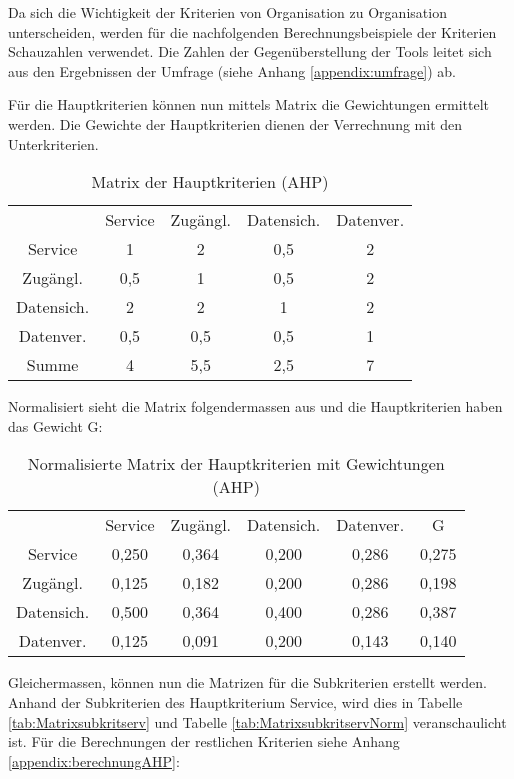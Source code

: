 Da sich die Wichtigkeit der Kriterien von Organisation zu Organisation unterscheiden, werden für die nachfolgenden Berechnungsbeispiele der Kriterien Schauzahlen verwendet. Die Zahlen der Gegenüberstellung der Tools leitet sich aus den Ergebnissen der Umfrage (siehe Anhang \ref{appendix:umfrage}) ab. 

Für die Hauptkriterien können nun mittels Matrix die Gewichtungen ermittelt werden. Die Gewichte der Hauptkriterien dienen der Verrechnung mit den Unterkriterien. 
\begin{table}[h]
	\centering
\begin{tabular}{ccccc}
  & Service & Zugängl. & Datensich. & Datenver. \\
  Service & 1 & 2 & 0,5 & 2 \\
  Zugängl. & 0,5 & 1 & 0,5 & 2 \\
  Datensich. & 2 & 2 & 1 & 2 \\
  Datenver. & 0,5 & 0,5 & 0,5 & 1 \\
  Summe & 4 & 5,5 & 2,5 & 7 \\
  \end{tabular} 
	\caption{ Matrix der Hauptkriterien (AHP)}
	\label{tab:MatrixHauptkriterien}
\end{table}

Normalisiert sieht die Matrix folgendermassen aus und die Hauptkriterien haben das Gewicht G: 
\begin{table}[h]
	\centering
\begin{tabular}{cccccc}
  & Service & Zugängl. & Datensich. & Datenver. & G \\
  Service & 0,250 & 0,364 & 0,200 & 0,286 & 0,275 \\
  Zugängl. & 0,125 & 0,182 & 0,200 & 0,286 & 0,198 \\
  Datensich. & 0,500 & 0,364 & 0,400 & 0,286 & 0,387 \\
  Datenver. & 0,125 & 0,091 & 0,200 & 0,143 & 0,140 \\
  \end{tabular} 
  \caption{Normalisierte Matrix der Hauptkriterien mit Gewichtungen (AHP)}
\label{tab:MatrixHauptkriterienGewicht}
\end{table}	

Gleichermassen, können nun die Matrizen für die Subkriterien erstellt werden. Anhand der Subkriterien des Hauptkriterium Service, wird dies in Tabelle \ref{tab:Matrixsubkritserv} und Tabelle \ref{tab:MatrixsubkritservNorm} veranschaulicht ist. Für die Berechnungen der restlichen Kriterien siehe Anhang \ref{appendix:berechnungAHP}:

